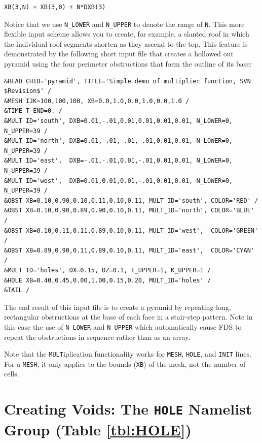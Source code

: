 \documentclass[11pt]{book}
\newcommand{\ct}{\tt\small}
\begin{document}
\footnotesize
\begin{verbatim}
XB(3,N) = XB(3,0) + N*DXB(3)
\end{verbatim}
\normalsize

\noindent
Notice that we use {\ct N\_LOWER} and {\ct N\_UPPER} to denote the range of {\ct N}. This more flexible input scheme allows you to create, for example,
a slanted roof in which the individual roof segments shorten as they ascend to the top.
This feature is demonstrated by the following short input file that creates a hollowed out pyramid using the four perimeter obstructions that form the
outline of its base:

\footnotesize
\begin{verbatim}
&HEAD CHID='pyramid', TITLE='Simple demo of multiplier function, SVN $Revision$' /
&MESH IJK=100,100,100, XB=0.0,1.0,0.0,1.0,0.0,1.0 /
&TIME T_END=0. /
&MULT ID='south', DXB=0.01,-.01,0.01,0.01,0.01,0.01, N_LOWER=0, N_UPPER=39 /
&MULT ID='north', DXB=0.01,-.01,-.01,-.01,0.01,0.01, N_LOWER=0, N_UPPER=39 /
&MULT ID='east',  DXB=-.01,-.01,0.01,-.01,0.01,0.01, N_LOWER=0, N_UPPER=39 /
&MULT ID='west',  DXB=0.01,0.01,0.01,-.01,0.01,0.01, N_LOWER=0, N_UPPER=39 /
&OBST XB=0.10,0.90,0.10,0.11,0.10,0.11, MULT_ID='south', COLOR='RED' /
&OBST XB=0.10,0.90,0.89,0.90,0.10,0.11, MULT_ID='north', COLOR='BLUE' /
&OBST XB=0.10,0.11,0.11,0.89,0.10,0.11, MULT_ID='west',  COLOR='GREEN' /
&OBST XB=0.89,0.90,0.11,0.89,0.10,0.11, MULT_ID='east',  COLOR='CYAN' /
&MULT ID='holes', DX=0.15, DZ=0.1, I_UPPER=1, K_UPPER=1 /
&HOLE XB=0.40,0.45,0.00,1.00,0.15,0.20, MULT_ID='holes' /
&TAIL /
\end{verbatim}
\normalsize

\noindent
The end result of this input file is to create a pyramid by repeating long, rectangular obstructions at the base of each
face in a stair-step pattern. Note in this case the use of {\ct N\_LOWER} and {\ct N\_UPPER} which automatically cause FDS to
repeat the obstructions in sequence rather than as an array.

Note that the {\ct MULT}iplication functionality works for {\ct MESH}, {\ct HOLE}, and {\ct INIT} lines. For a {\ct MESH}, it only applies to the
bounds ({\ct XB}) of the mesh, not the number of cells.



\clearpage

\section{Creating Voids: The \texorpdfstring{{\tt HOLE}}{HOLE} Namelist Group (Table \ref{tbl:HOLE})}
\label{info:HOLE}
\end{document}
